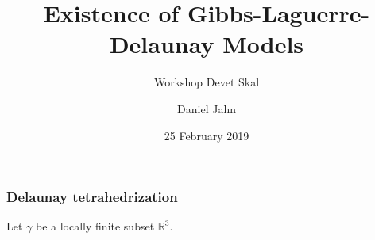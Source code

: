 \documentclass[c, 10pt]{beamer}
\title[Existence of Gibbs-Laguerre-Delaunay Models]{%
	Existence of Gibbs-Laguerre-Delaunay Models}
\subtitle[]{Workshop Devet Skal}
\author[jahn@karlin.mff.cuni.cz]{%
        Daniel Jahn}
\institute[KPMS]{%
           Department of Probability and Mathematical Statistics}
\date[25.2.2019]{%
      25 February 2019}
\begin{document}






\begin{frame}\frametitle{Delaunay tetrahedrization}
	Let $\gamma$ be a locally finite subset $\mathbb R^3$. 

	\vspace{8mm}




\end{frame}
\end{document}
